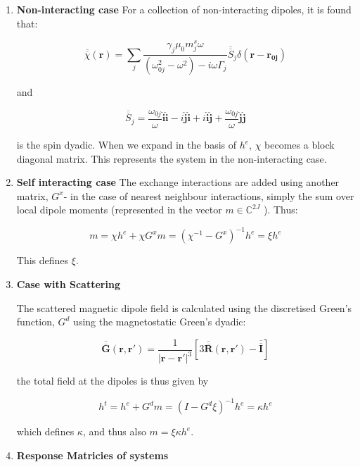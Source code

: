 \documentclass[12pt,twoside,a4paper,english]{article}
\begin{document}
\begin{enumerate}

\item \textbf{Non-interacting case}
For a collection of non-interacting dipoles, it is found that:

\[
\overline{\overline{\chi}}(\boldsymbol{r})=\sum_{j}\frac{\gamma_{j}\mu_{0}m_{j}^{s}\omega}{(\omega_{0j}^{2}-\omega^{2})-i\omega\Gamma_{j}}\overline{\overline{S}}_{j}\delta(\boldsymbol{r-\boldsymbol{r_{0j}}})
\]

and 

\[
\overline{\overline{S}}_{j}=\frac{\omega_{0j}}{\omega}\boldsymbol{\hat{i}\hat{i}}-i\boldsymbol{\hat{j}\hat{i}}+i\boldsymbol{\hat{i}\hat{j}}+\frac{\omega_{0j}}{\omega}\boldsymbol{\hat{j}\hat{j}}
\]

is the spin dyadic.
When we expand in the basis of \(\textstyle{h}^{e}\), $\chi$ becomes a block diagonal matrix. This
represents the system in the non-interacting case.


\item \textbf{Self interacting case}
The exchange interactions are added using another matrix, ${\textstyle G^{x}}$-
in the case of nearest neighbour interactions, simply the sum over
local dipole moments (represented in the vector $m\in\mathbb{C}^{2J}$
). Thus:

\[
{\textstyle m}=\chi{\textstyle h^{e}}+\chi{\textstyle G^{x}m}=(\chi^{-1}-{\textstyle G^{x}})^{-1}{\textstyle h^{e}}=\xi{\textstyle h^{e}}
\]

This defines \(\xi\).



\item \textbf{Case with Scattering}

The scattered magnetic dipole field is calculated using the discretised
Green's function, ${\textstyle G^{d}}$ using the magnetostatic Green's
dyadic:

\[
\overline{\overline{\boldsymbol{G}}}(\boldsymbol{r},\boldsymbol{r'})=\frac{1}{|\boldsymbol{r}-\boldsymbol{r'}|^{3}}[3\overline{\overline{\boldsymbol{R}}}(\boldsymbol{r},\boldsymbol{r'})-\overline{\overline{\boldsymbol{I}}}]
\]

the total field at the dipoles is thus given by 

\[
h^{t}=h^{e}+G^{d}m=(I-G^{d}\xi)^{-1}h^{e}=\kappa h^{e}
\]

which defines $\kappa$, and thus also $m=\xi\kappa h^{e}$.



\item \textbf{Response Matricies of systems}


\end{enumerate}
\end{document}
